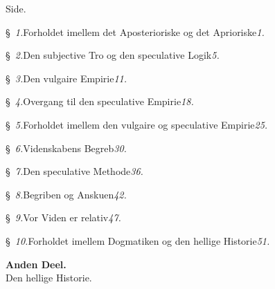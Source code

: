 \documentclass[12pt]{book}
\begin{document}
{\raggedleft Side.\par}
\smallskip

§~\textit{1.}\quad Forholdet imellem det Aposterioriske og det Aprioriske\dotfill\textit{1.}\par
§~\textit{2.}\quad Den subjective Tro og den speculative Logik\dotfill\textit{5.}\par
§~\textit{3.}\quad Den vulgaire Empirie\dotfill\textit{11.}\par
§~\textit{4.}\quad Overgang til den speculative Empirie\dotfill\textit{18.}\par
§~\textit{5.}\quad Forholdet imellem den vulgaire og speculative Empirie\dotfill\textit{25.}\par
§~\textit{6.}\quad Videnskabens Begreb\dotfill\textit{30.}\par
§~\textit{7.}\quad Den speculative Methode\dotfill\textit{36.}\par
§~\textit{8.}\quad Begriben og Anskuen\dotfill\textit{42.}\par
§~\textit{9.}\quad Vor Viden er relativ\dotfill\textit{47.}\par
§~\textit{10.}\quad Forholdet imellem Dogmatiken og den hellige Historie\dotfill\textit{51.}\par

\bigskip
\begin{center}
  {\large\bfseries Anden Deel.}\\[0.5\baselineskip]
  {\large Den hellige Historie.}
\end{center}
\medskip
\end{document}
